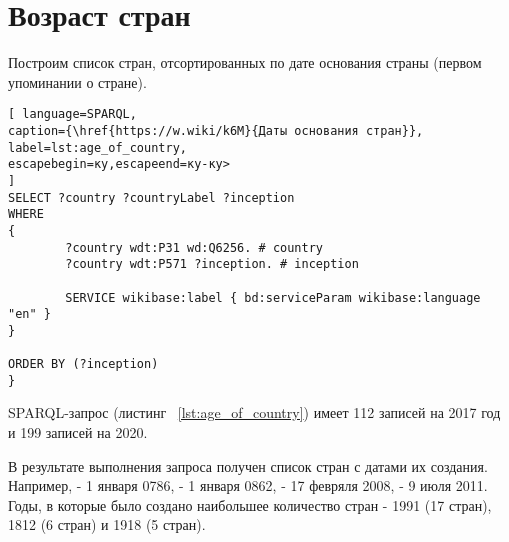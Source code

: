 \section{Возраст стран}


Построим список стран, отсортированных по дате основания страны (первом упоминании о стране).



\begin{lstlisting}[ language=SPARQL, 
caption={\href{https://w.wiki/k6M}{Даты основания стран}},
label=lst:age_of_country, 
escapebegin=ку,escapeend=ку-ку>
]
SELECT ?country ?countryLabel ?inception
WHERE
{
		?country wdt:P31 wd:Q6256. # country
		?country wdt:P571 ?inception. # inception
		
		SERVICE wikibase:label { bd:serviceParam wikibase:language "en" }
}

ORDER BY (?inception)
}
\end{lstlisting}

SPARQL-запрос (листинг ~\ref{lst:age_of_country}) имеет 112 записей на 2017 год и 199 записей на 2020.

В результате выполнения запроса получен список стран с датами их создания. Например,  - 1 января 0786,  - 1 января 0862,  - 17 февряля 2008,  - 9 июля 2011. Годы, в которые было создано наибольшее количество стран - 1991 (17 стран), 1812 (6 стран) и 1918 (5 стран).

